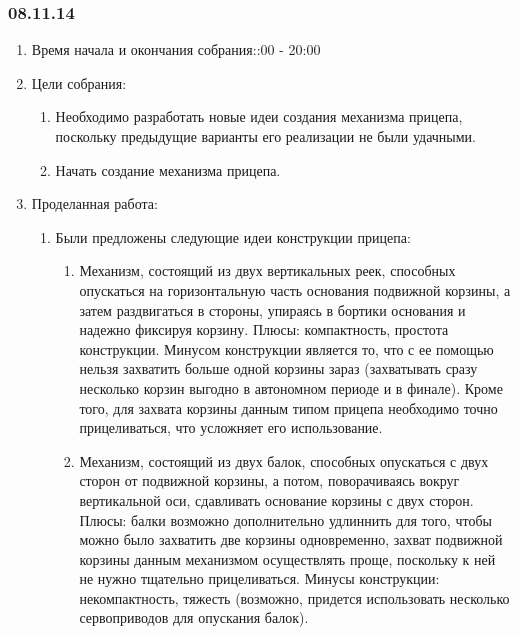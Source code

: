 
\subsubsection{08.11.14}

\begin{enumerate}
	\item Время начала и окончания собрания::00 - 20:00
	\item Цели собрания:\newline
	\begin{enumerate}
		\item Необходимо разработать новые идеи создания механизма прицепа, поскольку предыдущие варианты его реализации не были удачными.\newline
		
		\item Начать создание механизма прицепа.\newline
		
	\end{enumerate}
	
	\item Проделанная работа:\newline
	\begin{enumerate}
		\item Были предложены следующие идеи конструкции прицепа:\newline
		\begin{enumerate}
			\item Механизм, состоящий из двух вертикальных реек, способных опускаться на горизонтальную часть основания подвижной корзины, а затем раздвигаться в стороны, упираясь в бортики основания и надежно фиксируя корзину. Плюсы: компактность, простота конструкции. Минусом конструкции является то, что с ее помощью нельзя захватить больше одной корзины зараз (захватывать сразу несколько корзин выгодно в автономном периоде и в финале). Кроме того, для захвата корзины данным типом прицепа необходимо точно прицеливаться, что усложняет его использование.\newline
			
			\item Механизм, состоящий из двух балок, способных опускаться с двух сторон от подвижной корзины, а потом, поворачиваясь вокруг вертикальной оси, сдавливать основание корзины с двух сторон. Плюсы: балки возможно дополнительно удлиннить для того, чтобы можно было захватить две корзины одновременно, захват подвижной корзины данным механизмом осуществлять проще, поскольку к ней не нужно тщательно прицеливаться. Минусы конструкции: некомпактность, тяжесть (возможно, придется использовать несколько сервоприводов для опускания балок).\newline
			

\end{enumerate}
\end{enumerate}
\end{enumerate}
